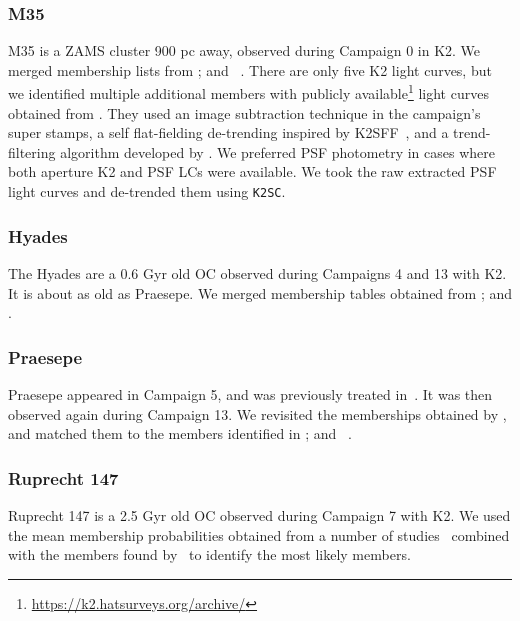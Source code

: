 \documentclass{aa}
\begin{document}
\subsubsection{M35}
M35 is a ZAMS cluster 900 pc away, observed during Campaign 0 in K2. We merged membership lists from \citet{cantat_gaudin_2018, gaia_dr2_2018_hrd}; and ~\citet{bouy_messier_2015}. There are only five K2 light curves, but we identified multiple additional members with publicly available\footnote{\url{https://k2.hatsurveys.org/archive/}} light curves obtained from \citet{soares_furtado_m35_2017}. They used an image subtraction technique in the campaign's super stamps, a self flat-fielding de-trending inspired by K2SFF~\citep{vanderburg_k2sff_2014}, and a trend-filtering algorithm developed by \citet{kovacs_tfa_algorithm_2005}. We preferred PSF photometry in cases where both aperture K2 and PSF LCs were available. We took the raw extracted PSF light curves and de-trended them using \texttt{K2SC}.
\subsubsection{Hyades}
The Hyades are a 0.6 Gyr old OC observed during Campaigns 4 and 13 with K2. It is about as old as Praesepe. We merged membership tables obtained from \citet{douglas_praesepe_hyades_2014, reino_hyades_2018}; and \citet{gaia_dr2_2018_hrd}.
\subsubsection{Praesepe}
Praesepe appeared in Campaign 5, and was previously treated in~. It was then observed again during Campaign 13. We revisited the memberships obtained by \citet{douglas_praesepe_hyades_2014}, and matched them to the members identified in \citet{douglas_poking_2017, rebull_praesepe_2017,cantat_gaudin_2018}; and ~\citet{gaia_dr2_2018_hrd}.
\subsubsection{Ruprecht 147}
Ruprecht 147 is a 2.5 Gyr old OC observed during Campaign 7 with K2. We used the mean membership probabilities obtained from a number of studies~\citep{curtis_ruprecht_2013, cantat_gaudin_2018, olivares_ngc6774_2019} combined with the members found by~\citet{gaia_dr2_2018_hrd} to identify the most likely members.
\end{document}
